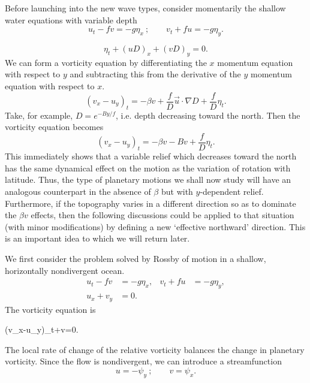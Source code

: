 Before launching into the new wave types, consider momentarily the shallow water
equations with variable depth
\[
	u_t-fv=-g\eta_x
	\ ;\qquad
	v_t+fu=-g\eta_y.
\]

\sourcepagebreak

\[
	\eta_t+(uD)_x+(vD)_y=0.
\]
We can form a vorticity equation by differentiating the $x$ momentum equation with
respect to $y$ and subtracting this from the derivative of the $y$ momentum equation
with respect to $x$.
\[
	(v_x-u_y)_t=-\beta v+\frac{f}{D}\vec u\cdot\nabla D+\frac{f}{D}\eta_t.
\]
Take, for example, $D=e^{-By/f}$, i.e. depth decreasing toward the north. Then the
vorticity equation becomes
\[
	(v_x-u_y)_t=-\beta v-Bv+\frac{f}{D}\eta_t.
\]
This immediately shows that a variable relief which decreases toward the north has the
same dynamical effect on the motion as the variation of rotation with latitude. Thus,
the type of planetary motions we shall now study will have an analogous counterpart
in the absence of $\beta$ but with $y$-dependent relief. Furthermore, if the topography
varies in a different direction so as to dominate the $\beta v$ effects, then the
following discussions could be applied to that situation (with minor modifications) by
defining a new `effective northward' direction. This is an important idea to which we
will return later.

We first consider the problem solved by Rossby of motion in a shallow, horizontally
nondivergent ocean.
\begin{align*}
	u_t-fv  & =-g\eta_x,
	        & v_t+fu     & =-g\eta_y, \\
	u_x+v_y & =0.
\end{align*}
The vorticity equation is
\begin{waveequation}
	(v_x-u_y)_t+\beta v=0.
\end{waveequation}
The local rate of change of the relative vorticity balances the change in planetary
vorticity. Since the flow is nondivergent, we can introduce a streamfunction
\[
	u=-\psi_y
	\ ;\qquad
	v=\psi_x.
\]


